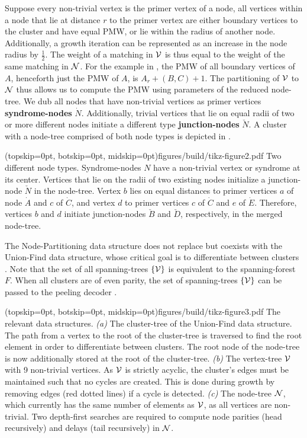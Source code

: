 Suppose every non-trivial vertex is the primer vertex of a node, all vertices within a node that lie at distance $r$ to the primer vertex are either boundary vertices to the cluster and have equal PMW, or lie within the radius of another node. Additionally, a growth iteration can be represented as an increase in the node radius by $\frac{1}{2}$. The weight of a matching in $\mathcal{V}$ is thus equal to the weight of the same matching in $\mathcal{N}$. For the example in , the PMW of all boundary vertices of $A$, henceforth just the PMW of $A$, is $A_r + (B,C) +1$. The partitioning of $\mathcal{V}$ to $\mathcal{N}$ thus allows us to compute the PMW using parameters of the reduced node-tree. We dub all nodes that have non-trivial vertices as primer vertices \textbf{syndrome-nodes} $\dot{N}$. Additionally, trivial vertices that lie on equal radii of two or more different nodes initiate a different type \textbf{junction-nodes} $\check{N}$. A cluster with a node-tree comprised of both node types is depicted in . 

\Figure[htb](topskip=0pt, botskip=0pt, midskip=0pt){figures/build/tikz-figure2.pdf}{
Two different node types. Syndrome-nodes $N$ have a non-trivial vertex or syndrome at its center. Vertices that lie on the radii of two existing nodes initialize a junction-node $\check{N}$ in the node-tree. Vertex $b$ lies on equal distances to primer vertices $a$ of node $\dot{A}$ and $c$ of $\dot{C}$, and vertex $d$ to primer vertices $c$ of $\dot{C}$ and $e$ of $\dot{E}$. Therefore, vertices $b$ and $d$ initiate junction-nodes $\check{B}$ and $\check{D}$, respectively, in the merged node-tree. \label{fig2}}

The Node-Partitioning data structure does not replace but coexists with the Union-Find data structure, whose critical goal is to differentiate between clusters \cite{delfosse2017almost}. Note that the set of all spanning-trees $\{\mathcal{V}\}$ is equivalent to the spanning-forest $F$. When all clusters are of even parity, the set of spanning-trees $\{\mathcal{V}\}$ can be passed to the peeling decoder \cite{delfosse2017linear}. 

\Figure[hbt](topskip=0pt, botskip=0pt, midskip=0pt){figures/build/tikz-figure3.pdf}{
    The relevant data structures. \emph{(a)} The cluster-tree of the Union-Find data structure. The path from a vertex to the root of the cluster-tree is traversed to find the root element in order to differentiate between clusters. The root node of the node-tree is now additionally stored at the root of the cluster-tree. \emph{(b)} The vertex-tree $\mathcal{V}$ with 9 non-trivial vertices. As $\mathcal{V}$ is strictly acyclic, the cluster's edges must be maintained such that no cycles are created. This is done during growth by removing edges (red dotted lines) if a cycle is detected. \emph{(c)} The node-tree $\mathcal{N}$, which currently has the same number of elements as $\mathcal{V}$, as all vertices are non-trivial. Two depth-first searches are required to compute node parities (head recursively) and delays (tail recursively) in $\mathcal{N}$.\label{fig3}}

